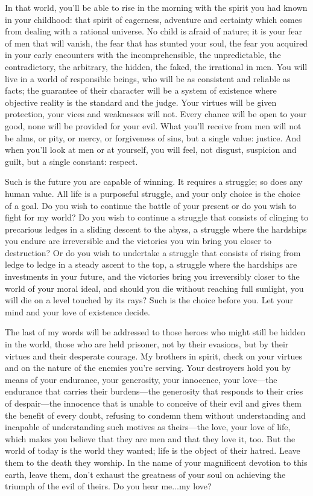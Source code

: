 			In that world, you'll be able to rise in the morning with the spirit you had known in your childhood: that spirit of eagerness, adventure and certainty which comes from dealing with a rational universe. No child is afraid of nature; it is your fear of men that will vanish, the fear that has stunted your soul, the fear you acquired in your early encounters with the incomprehensible, the unpredictable, the contradictory, the arbitrary, the hidden, the faked, the irrational in men. You will live in a world of responsible beings, who will be as consistent and reliable as facts; the guarantee of their character will be a system of existence where objective reality is the standard and the judge. Your virtues will be given protection, your vices and weaknesses will not. Every chance will be open to your good, none will be provided for your evil. What you'll receive from men will not be alms, or pity, or mercy, or forgiveness of sins, but a single value: justice. And when you'll look at men or at yourself, you will feel, not disgust, suspicion and guilt, but a single constant: respect.

			Such is the future you are capable of winning. It requires a struggle; so does any human value. All life is a purposeful struggle, and your only choice is the choice of a goal. Do you wish to continue the battle of your present or do you wish to fight for my world? Do you wish to continue a struggle that consists of clinging to precarious ledges in a sliding descent to the abyss, a struggle where the hardships you endure are irreversible and the victories you win bring you closer to destruction? Or do you wish to undertake a struggle that consists of rising from ledge to ledge in a steady ascent to the top, a struggle where the hardships are investments in your future, and the victories bring you irreversibly closer to the world of your moral ideal, and should you die without reaching full sunlight, you will die on a level touched by its rays? Such is the choice before you. Let your mind and your love of existence decide.

			The last of my words will be addressed to those heroes who might still be hidden in the world, those who are held prisoner, not by their evasions, but by their virtues and their desperate courage. My brothers in spirit, check on your virtues and on the nature of the enemies you're serving. Your destroyers hold you by means of your endurance, your generosity, your innocence, your love---the endurance that carries their burdens---the generosity that responds to their cries of despair---the innocence that is unable to conceive of their evil and gives them the benefit of every doubt, refusing to condemn them without understanding and incapable of understanding such motives as theirs---the love, your love of life, which makes you believe that they are men and that they love it, too. But the world of today is the world they wanted; life is the object of their hatred. Leave them to the death they worship. In the name of your magnificent devotion to this earth, leave them, don't exhaust the greatness of your soul on achieving the triumph of the evil of theirs. Do you hear me...my love?

